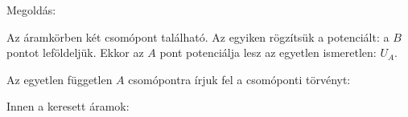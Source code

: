 
\ifdefined\megoldas
  
 Megoldás: 

 Az áramkörben két csomópont található. Az egyiken rögzítsük a potenciált: a $B$ pontot leföldeljük. Ekkor az $A$ pont potenciálja lesz az egyetlen ismeretlen: $U_A$.

 Az egyetlen független $A$ csomópontra írjuk fel a csomóponti törvényt:

 Innen a keresett áramok:
 
\fi